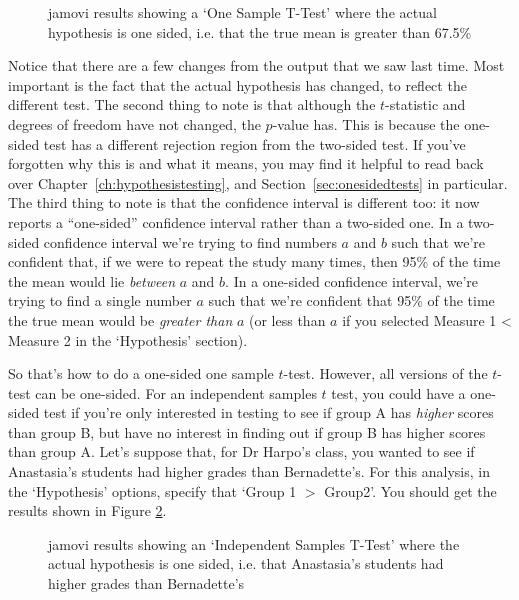 \begin{figure}[htb]
\begin{center}
\caption{jamovi results showing a `One Sample T-Test' where the actual hypothesis is one sided, i.e. that the true mean is greater than 67.5\%}
\label{fig:ttest_onesided1}
\HR
\end{center}
\end{figure}

Notice that there are a few changes from the output that we saw last time. Most important is the fact that the actual hypothesis has changed, to reflect the different test. The second thing to note is that although the $t$-statistic and degrees of freedom have not changed, the $p$-value has. This is because the one-sided test has a different rejection region from the two-sided test. If you've forgotten why this is and what it means, you may find it helpful to read back over Chapter~\ref{ch:hypothesistesting}, and Section~\ref{sec:onesidedtests} in particular. The third thing to note is that the confidence interval is different too: it now reports a ``one-sided'' confidence interval rather than a two-sided one. In a two-sided confidence interval we're trying to find numbers $a$ and $b$ such that we're confident that, if we were to repeat the study many times, then 95\% of the time the mean would lie {\it between} $a$ and $b$. In a one-sided confidence interval, we're trying to find a single number $a$ such that we're confident that 95\% of the time the true mean would be {\it greater than} $a$ (or less than $a$ if you selected Measure 1 < Measure 2 in the `Hypothesis' section).

So that's how to do a one-sided one sample $t$-test. However, all versions of the $t$-test can be one-sided. For an independent samples $t$ test, you could have a one-sided test if you're only interested in testing to see if group A has {\it higher} scores than group B, but have no interest in finding out if group B has higher scores than group A. Let's suppose that, for Dr Harpo's class, you wanted to see if Anastasia's students had higher grades than Bernadette's. For this analysis, in the `Hypothesis' options, specify that `Group 1 $>$ Group2'. You should get the results shown in Figure \ref{fig:ttest_onesided2}.

\begin{figure}[htb]
\begin{center}
\caption{jamovi results showing an `Independent Samples T-Test' where the actual hypothesis is one sided, i.e. that Anastasia's students had higher grades than Bernadette's}
\label{fig:ttest_onesided2}
\HR
\end{center}
\end{figure}

